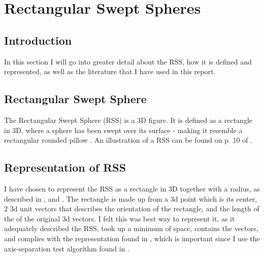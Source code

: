 
\section{Rectangular Swept Spheres}
\label{rss}

\subsection{Introduction}
In this section I will go into greater detail about the RSS, how it is defined and represented, as well as the literature that I have used in this report.

\subsection{Rectangular Swept Sphere}
The Rectangular Swept Sphere (RSS) is a 3D figure. It is defined as a rectangle in 3D, where a sphere has been swept over its surface - making it resemble a rectangular rounded pillow . An illustration of a RSS can be found on p. 10 of \cite{Larsen99fastproximity}. 

\subsection{Representation of RSS}
I have chosen to represent the RSS as a rectangle in 3D together with a radius, as described in \cite{larsen00fast}, \cite{Larsen99fastproximity} and \cite{237244}. The rectangle is made up from a 3d point which is its center, 2 3d unit vectors that describes the orientation  of the rectangle, and the length of the of the original 3d vectors. I felt this was best way to represent it, as it adequately described the RSS, took up a minimum of space, contains the vectors, and complies with the representation found in \cite{327244}, which is important since I use the axis-separation test algorithm found in \cite{237244}.


